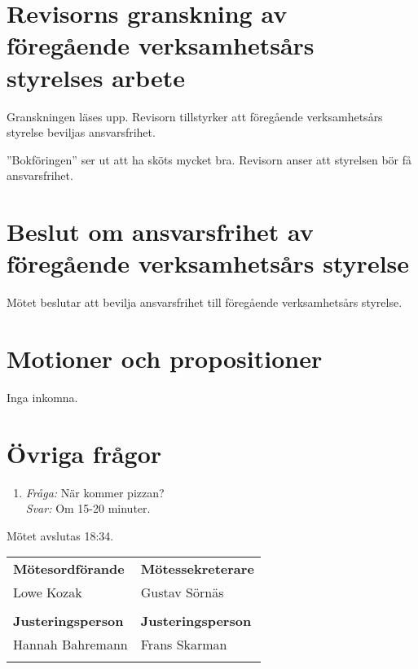 \documentclass[a4paper]{article}
\newenvironment{quotationb}%
{\begin{leftbar}}%
{\end{leftbar}}
\begin{document}
\section{Revisorns granskning av föregående verksamhetsårs styrelses arbete}

Granskningen läses upp. Revisorn tillstyrker att föregående verksamhetsårs
styrelse beviljas ansvarsfrihet.

\begin{quotationb}

''Bokföringen'' ser ut att ha sköts mycket bra. Revisorn anser att styrelsen bör
    få ansvarsfrihet.

\end{quotationb}

\section{Beslut om ansvarsfrihet av föregående verksamhetsårs styrelse}

Mötet beslutar att bevilja ansvarsfrihet till föregående verksamhetsårs
styrelse.

\section{Motioner och propositioner}

Inga inkomna.

\section{Övriga frågor}

\begin{enumerate}
\def\labelenumi{\arabic{enumi}.}
\item \emph{Fråga:} När kommer pizzan? \\
    \emph{Svar:} Om 15-20 minuter.
\end{enumerate}

Mötet avslutas 18:34.

\vspace{2em}

\begin{tabular}{@{}p{}p{}@{}}
  \textbf{Mötesordförande} & \textbf{Mötessekreterare} \\[0.3em]
  Lowe Kozak & Gustav Sörnäs \\
  \vspace{8em} &\\
  \textbf{Justeringsperson} & \textbf{Justeringsperson} \\[0.3em]
  Hannah Bahremann & Frans Skarman \\
  \vspace{8em} &\\
\end{tabular}
\end{document}

